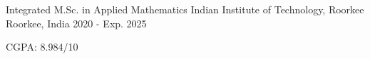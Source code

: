 

\begin{cventries}

  \cventry
    {Integrated M.Sc. in Applied Mathematics} %
    {Indian Institute of Technology, Roorkee} %
    {Roorkee, India} %
    {2020 - Exp. 2025} %
    {
      \begin{cvitems} %
        \item {CGPA: 8.984/10}
      \end{cvitems}
    }

\end{cventries}
